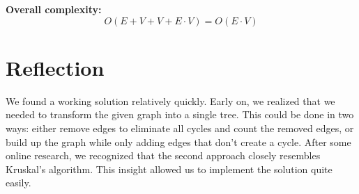 \documentclass[a4paper]{article}
\begin{document}
\textbf{Overall complexity:}  
\[
O(E + V + V + E \cdot V) = O(E \cdot V)
\]
\section{Reflection}
We found a working solution relatively quickly. Early on, we realized that we needed to transform the given graph into a single tree. This could be done in two ways: either remove edges to eliminate all cycles and count the removed edges, or build up the graph while only adding edges that don’t create a cycle. After some online research, we recognized that the second approach closely resembles Kruskal’s algorithm. This insight allowed us to implement the solution quite easily.
\end{document}
